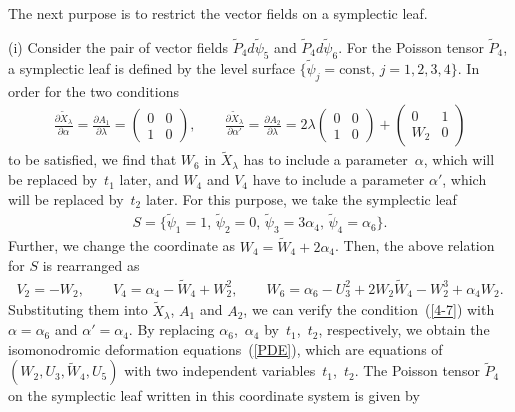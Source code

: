 \documentclass[pdftex]{sigma}
\numberwithin{equation}{section}
\begin{document}
The next purpose is to restrict the vector f\/ields on a symplectic leaf.

(i) Consider the pair of vector f\/ields $\widetilde{P}_4 d\widetilde{\psi}_5$ and $\widetilde{P}_4 d\widetilde{\psi}_6$. For the Poisson tensor $\widetilde{P}_4$, a symplectic leaf is def\/ined by the level surface $\{ \widetilde{\psi}_j = \text{const},\, j=1,2,3,4\}$. In order for the two conditions
\begin{gather}
\frac{\partial \widetilde{X}_\lambda }{\partial \alpha } = \frac{\partial A_1 }{\partial \lambda } = \left(
\begin{matrix}
0 & 0 \\
1 & 0
\end{matrix}
\right), \qquad
\frac{\partial \widetilde{X}_\lambda }{\partial \alpha' } = \frac{\partial A_2 }{\partial \lambda } = 2\lambda \left(
\begin{matrix}
0 & 0 \\
1 & 0
\end{matrix}
\right) + \left(
\begin{matrix}
0 & 1 \\
W_2 & 0
\end{matrix}
\right)\label{4-7}
\end{gather}
to be satisf\/ied, we f\/ind that $W_6$ in $\widetilde{X}_\lambda $ has to include a parameter~$\alpha $, which will be replaced by~$t_1$ later, and $W_4$ and $V_4$ have to include a parameter $\alpha' $, which will be replaced by~$t_2$ later. For this purpose, we take the symplectic leaf
\begin{gather*}
S = \big\{ \widetilde{\psi}_1 = 1,\, \widetilde{\psi}_2 = 0 ,\, \widetilde{\psi}_3 = 3\alpha _4,\,\widetilde{\psi}_4 = \alpha _6\big\}.
\end{gather*}
Further, we change the coordinate as $W_4 = \widetilde{W}_4 + 2\alpha _4$. Then, the above relation for $S$ is rearranged as
\begin{gather*}
 V_2 = -W_2,\qquad V_4 = \alpha _4-\widetilde{W}_4+W_2^2,\qquad W_6 = \alpha _6 - U_3^2 + 2W_2\widetilde{W}_4 - W_2^3 + \alpha _4W_2.
\end{gather*}
Substituting them into $\widetilde{X}_\lambda$, $A_1$ and $A_2$, we can verify the condition~(\ref{4-7}) with $\alpha = \alpha _6$ and $\alpha ' = \alpha _4$. By replacing $\alpha _6$,~$\alpha _4$ by~$t_1$,~$t_2$, respectively, we obtain the isomonodromic deformation equations~(\ref{PDE}), which are equations of $(W_2,U_3,\widetilde{W}_4, U_5)$ with two independent variables~$t_1$,~$t_2$. The Poisson tensor $\widetilde{P}_4$ on the symplectic leaf written in this coordinate system is given by
\end{document}

